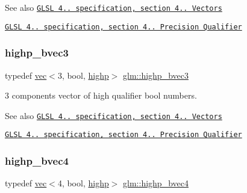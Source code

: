 \begin{DoxySeeAlso}{See also}
\href{http://www.opengl.org/registry/doc/GLSLangSpec.4.20.8.pdf}{\tt G\+L\+SL 4.. specification, section 4.. Vectors} 

\href{http://www.opengl.org/registry/doc/GLSLangSpec.4.20.8.pdf}{\tt G\+L\+SL 4.. specification, section 4.. Precision Qualifier} 
\end{DoxySeeAlso}
\mbox{\label{group__core__precision_ga0e3365e13160aa93d2a9c68529a013ce}} 
\subsubsection{\texorpdfstring{highp\+\_\+bvec3}{highp\_bvec3}}
{\footnotesize\ttfamily typedef \mbox{\hyperlink{structglm_1_1vec}{vec}}$<$3, bool, \mbox{\hyperlink{namespaceglm_a36ed105b07c7746804d7fdc7cc90ff25ac6f7eab42eacbb10d59a58e95e362074}{highp}}$>$ \mbox{\hyperlink{group__core__precision_ga0e3365e13160aa93d2a9c68529a013ce}{glm\+::highp\+\_\+bvec3}}}

3 components vector of high qualifier bool numbers.

\begin{DoxySeeAlso}{See also}
\href{http://www.opengl.org/registry/doc/GLSLangSpec.4.20.8.pdf}{\tt G\+L\+SL 4.. specification, section 4.. Vectors} 

\href{http://www.opengl.org/registry/doc/GLSLangSpec.4.20.8.pdf}{\tt G\+L\+SL 4.. specification, section 4.. Precision Qualifier} 
\end{DoxySeeAlso}
\mbox{\label{group__core__precision_gaa99e0301060bf06e7750c1c3591b6b4e}} 
\subsubsection{\texorpdfstring{highp\+\_\+bvec4}{highp\_bvec4}}
{\footnotesize\ttfamily typedef \mbox{\hyperlink{structglm_1_1vec}{vec}}$<$4, bool, \mbox{\hyperlink{namespaceglm_a36ed105b07c7746804d7fdc7cc90ff25ac6f7eab42eacbb10d59a58e95e362074}{highp}}$>$ \mbox{\hyperlink{group__core__precision_gaa99e0301060bf06e7750c1c3591b6b4e}{glm\+::highp\+\_\+bvec4}}}

